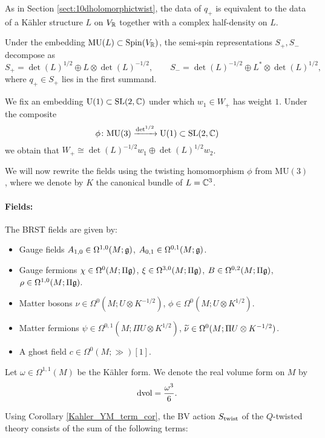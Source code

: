 \documentclass[10pt, oneside]{article}
\newcommand{\MU}{\mathrm{MU}}
\renewcommand{\U}{\mathrm{U}}
\begin{document}
As in Section \ref{sect:10dholomorphictwist}, the data of $q_+$ is equivalent to the data of a K\"ahler structure $L$ on $V_\mathbb R$ together with a complex half-density on $L$.

Under the embedding $\MU(L)\subset \Spin(V_\RR)$, the semi-spin representations $S_+, S_-$ decompose as
\[S_+ = \det(L)^{1/2}\oplus L\otimes \det(L)^{-1/2},\qquad S_- = \det(L)^{-1/2} \oplus L^*\otimes \det(L)^{1/2},\]
where $q_+\in S_+$ lies in the first summand.

We fix an embedding $\U(1)\subset \SL(2, \CC)$ under which $w_1\in W_+$ has weight $1$. Under the composite
\[\phi\colon\MU(3)\xrightarrow{\det^{1/2}}\U(1)\subset \SL(2, \CC)\]
we obtain that $W_+\cong \det(L)^{-1/2} w_1\oplus \det(L)^{1/2} w_2$.

We will now rewrite the fields using the twisting homomorphism $\phi$ from $\MU(3)$, where we denote by $K$ the canonical bundle of $L=\mathbb C^3$.

\vspace{-10pt}
\paragraph{Fields:} The BRST fields are given by:
\begin{itemize}
\item Gauge fields $A_{1, 0} \in \Omega^{1, 0}(M; \mathfrak g)$, $A_{0, 1}\in\Omega^{0, 1}(M; \mathfrak g)$.
\item Gauge fermions $\chi\in\Omega^0(M; \Pi\mathfrak g)$, $\xi\in\Omega^{3, 0}(M; \Pi\mathfrak g)$, $B\in\Omega^{0, 2}(M; \Pi\mathfrak g)$, $\rho\in\Omega^{1, 0}(M; \Pi\mathfrak g)$.
\item Matter bosons $\nu\in\Omega^0(M; U\otimes K^{-1/2})$, $\phi\in\Omega^0(M; U\otimes K^{1/2})$.
\item Matter fermions $\psi\in \Omega^{0, 1}(M; \Pi U\otimes K^{1/2})$, $\widetilde{\nu}\in\Omega^0(M; \Pi U\otimes K^{-1/2})$.
\item A ghost field $c\in \Omega^0(M; \gg)[1]$.
\end{itemize}

Let $\omega\in\Omega^{1, 1}(M)$ be the K\"ahler form. We denote the real volume form on $M$ by
\[\operatorname{dvol} = \frac{\omega^3}{6}.\]

Using Corollary \ref{Kahler_YM_term_cor}, the BV action $S_{\mathrm{twist}}$ of the $Q$-twisted theory consists of the sum of the following terms:
\end{document}
